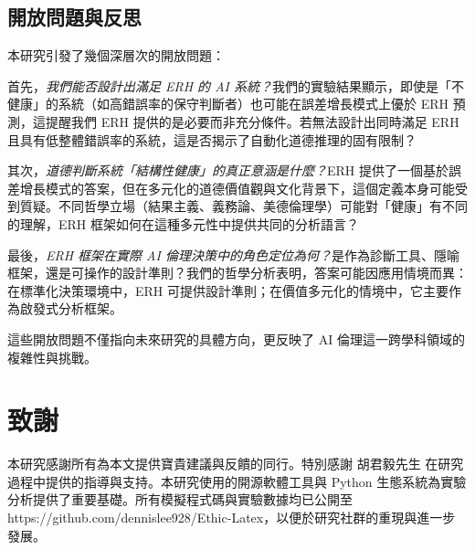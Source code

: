 \documentclass[12pt,a4paper]{article}
\theoremstyle{definition}
\theoremstyle{remark}
\begin{document}
\subsection{開放問題與反思}

本研究引發了幾個深層次的開放問題：

首先，\emph{我們能否設計出滿足 ERH 的 AI 系統？}我們的實驗結果顯示，即使是「不健康」的系統（如高錯誤率的保守判斷者）也可能在誤差增長模式上優於 ERH 預測，這提醒我們 ERH 提供的是必要而非充分條件。若無法設計出同時滿足 ERH 且具有低整體錯誤率的系統，這是否揭示了自動化道德推理的固有限制？

其次，\emph{道德判斷系統「結構性健康」的真正意涵是什麼？}ERH 提供了一個基於誤差增長模式的答案，但在多元化的道德價值觀與文化背景下，這個定義本身可能受到質疑。不同哲學立場（結果主義、義務論、美德倫理學）可能對「健康」有不同的理解，ERH 框架如何在這種多元性中提供共同的分析語言？

最後，\emph{ERH 框架在實際 AI 倫理決策中的角色定位為何？}是作為診斷工具、隱喻框架，還是可操作的設計準則？我們的哲學分析表明，答案可能因應用情境而異：在標準化決策環境中，ERH 可提供設計準則；在價值多元化的情境中，它主要作為啟發式分析框架。

這些開放問題不僅指向未來研究的具體方向，更反映了 AI 倫理這一跨學科領域的複雜性與挑戰。

\section*{致謝}

本研究感謝所有為本文提供寶貴建議與反饋的同行。特別感謝 胡君毅先生 在研究過程中提供的指導與支持。本研究使用的開源軟體工具與 Python 生態系統為實驗分析提供了重要基礎。所有模擬程式碼與實驗數據均已公開至https://github.com/dennislee928/Ethic-Latex，以便於研究社群的重現與進一步發展。



\end{document}
